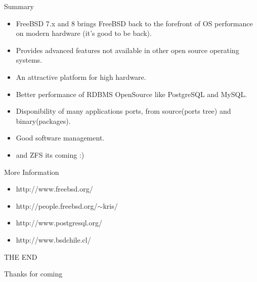 \documentclass[xcolor=dvipsnames]{beamer}
\begin{document}
	\begin{frame}{\scriptsize{Summary}} 
	\begin{itemize}
		\item FreeBSD 7.x and 8 brings FreeBSD back to the forefront of OS performance \\
		on modern hardware (it's good to be back).
		\item Provides advanced features not available in other open source operating systems.
		\item An attractive platform for high hardware.
		\item Better performance of RDBMS OpenSource like PostgreSQL and MySQL.
		\item Disponibility of many applications ports, from source(ports tree) and binary(packages).
		\item Good software management.
		\item and ZFS its coming :)
	\end{itemize}
	\end{frame}

	\begin{frame}{\scriptsize{More Information}}
	\begin{itemize}
		\item http://www.freebsd.org/
		\item http://people.freebsd.org/$\sim$kris/
		\item http://www.postgresql.org/
		\item http://www.bsdchile.cl/
	\end{itemize}
	\end{frame}
		
	\begin{frame}{\begin{center}THE END\end{center}} 
		\begin{center}
			Thanks for coming 
		\end{center}
	\end{frame}
\end{document}
